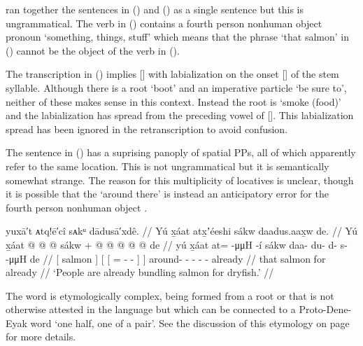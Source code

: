 \citeauthor{swanton:1909} ran together the sentences in (\lastx) and (\nextx) as a single sentence but this is ungrammatical.
The verb  in (\lastx) contains a fourth person nonhuman object pronoun  ‘something, things, stuff’ which means that the phrase  ‘that salmon’ in (\nextx) cannot be the object of the verb in (\lastx).

The transcription  in (\lastx) implies  [] with labialization on the onset [] of the stem syllable.
Although there is a root  ‘boot’ and an imperative particle  ‘be sure to’, neither of these makes sense in this context.
Instead the root is  ‘smoke (food)’ and the labialization has spread from the preceding vowel of [].
This labialization spread has been ignored in the retranscription to avoid confusion.

The sentence in (\lastx) has a suprising panoply of spatial PPs, all of which apparently refer to the same location.
This is not ungrammatical but it is semantically somewhat strange.
The reason for this multiplicity of locatives is unclear, though it is possible that the  ‘around there’ is instead an anticipatory error for the fourth person nonhuman object .

\ex\label{ex:099-4-bundling-salmon}%
%
\begingl
	\glpreamble	yuxā′t ᴀtq!ē′cî sᴀkᵘ dādusā′xdê.  //
	\glpreamble	Yú x̱áat atx̱ʼéeshi sákw daadus.aax̱w de. //
	\gla	{} Yú x̱áat {}
		{} {}  @ {} @ {} @ {} {} sákw {} +
		 @ {} @ {} @ {} @ {} @ {} de //
	\glb	{} yú x̱áat {}
		{} {} at=  -μμH -í {} sákw {}
		daa- du- d- s-  -μμH de //
	\glc	{}[  salmon {}]
		{}[ {}[ =  - - {}]  {}]
		around- - - -  -
		already //
	\gld	{} that salmon {}
		{} {}  {} {} {} {} for {}
		 {} {} {} {} {} already //
	\glft	‘People are already bundling salmon for dryfish.’
		//
\endgl
\xe

The word  is etymologically complex, being formed from a root  or  that is not otherwise attested in the language but which can be connected to a Proto-Dene-Eyak word  ‘one half, one of a pair’.
See the discussion of this etymology on page \pageref{note:100-dryfish-discussion} for more details.

